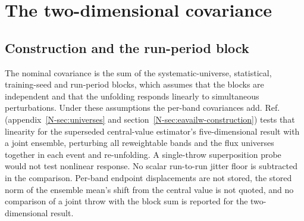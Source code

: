 \section{The two-dimensional covariance}
\label{supp:cov2d}

\subsection{Construction and the run-period block}
\label{supp:cov2d-construction}

\label{sec:uq-combine}
The nominal covariance is the sum of the systematic-universe, statistical, training-seed and run-period blocks, which assumes that the blocks are independent and that the unfolding responds linearly to simultaneous perturbations. Under these assumptions the per-band covariances add. Ref.~\cite{AnalysisNote2026} (appendix~\ref*{N-sec:universes} and section~\ref*{N-sec:eavailw-construction}) tests that linearity for the superseded central-value estimator's five-dimensional result with a joint ensemble, perturbing all reweightable bands and the flux universes together in each event and re-unfolding. A single-throw superposition probe would not test nonlinear response. No scalar run-to-run jitter floor is subtracted in the comparison. Per-band endpoint displacements are not stored, the stored norm of the ensemble mean's shift from the central value is not quoted, and no comparison of a joint throw with the block sum is reported for the two-dimensional result.

